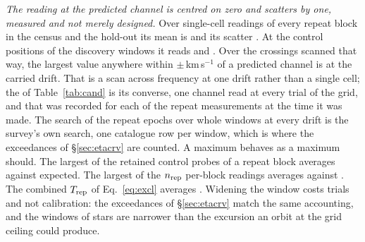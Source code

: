 \begin{table}
\centering
\caption{\textbf{What an injected carrier at the trigger amplitude is
recovered at}, for each of the \HjNMeas{} crossings that carry an exclusion,
ordered by what is measured. Every realisation was deposited in the retained
per-integration spectra of the real data -- the discovery block and the
$n_{\rm rep}$ covering repeat blocks, \GpNRoleInj{} windows in all -- and none
used synthetic noise. $\nu_\star$ is the crossing's frequency in the
star's own rest frame, $\Phi$ the chance the expression above gives, and
beside it the fraction of $N$ realisations of the frozen reading that
recovered the carrier, with its binomial interval. The leading
\HjNPowerLo{} rows are the crossings reported untested rather than excluded.}
\label{tab:hostinj}
\scriptsize

\end{table}

\emph{The reading at the predicted channel is centred on zero and scatters
by one, measured and not merely designed.} Over \NuNullN{} single-cell
readings of every repeat block in the census and the hold-out its mean is
\NuNullMean{} and its scatter \NuNullSd. At the control positions of the
discovery windows it reads \NuDiscCtrlMean{} and \NuDiscCtrlSd. Over the
\WdBandNCross{} crossings scanned that way, the
largest value anywhere within $\pm$\WdBandKms\,km\,s$^{-1}$ of a predicted
channel is \WdBandMax{} at the carried drift. That is a scan across frequency
at one drift rather than a single cell; the
\RcTMax{} of Table~\ref{tab:cand} is its converse, one channel read at every
trial of the grid, and that was recorded for each of the \RcNRepeatMeas{}
repeat measurements at the time it was made. The search of the repeat epochs
over whole windows at every drift is the survey's own search, one catalogue
row per window, which is where the \WdNExc{} exceedances of
\S\ref{sec:etacrv} are counted. A maximum behaves as a maximum should. The
largest of the
\NuCtrlRet{} retained control probes of a repeat block averages
\NuCtrlMean{} against \NuCtrlPred{} expected. The largest of the
$n_{\rm rep}$ per-block readings averages \NuColMean{} against \NuColPred. The
combined $T_{\rm rep}$ of Eq.~\ref{eq:excl} averages \NuRepMean. Widening
the window
costs trials and not calibration: the exceedances of \S\ref{sec:etacrv}
match the same accounting, and the windows of \EcNShortStar{} stars are
narrower than the excursion an orbit at the grid ceiling could produce.


